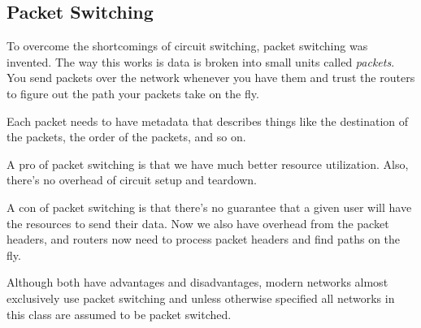 \subsection{Packet Switching}
To overcome the shortcomings of circuit switching, packet switching was invented.
The way this works is data is broken into small units called \emph{packets}.
You send packets over the network whenever you have them and trust the routers
to figure out the path your packets take on the fly.

Each packet needs to have metadata that describes things like the destination
of the packets, the order of the packets, and so on.

A pro of packet switching is that we have much better resource utilization.
Also, there's no overhead of circuit setup and teardown.

A con of packet switching is that there's no guarantee that a given user
will have the resources to send their data. Now we also have overhead from
the packet headers, and routers now need to process packet headers and find paths
on the fly.

Although both have advantages and disadvantages, modern networks almost
exclusively use packet switching and unless otherwise specified all
networks in this class are assumed to be packet switched.